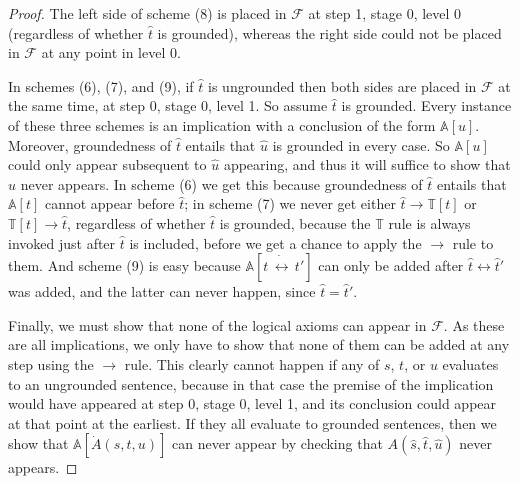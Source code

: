 \documentclass[10pt,a4paper]{amsart}
\begin{document}
\begin{proof}
  The left side of scheme (8) is placed in $\mathcal{F}$ at step 1, stage 0, level 0 (regardless of whether $\hat{t}$
  is grounded), whereas the right side could not be placed in $\mathcal{F}$ at any point in level 0.

  In schemes (6), (7), and (9), if $\hat{t}$ is ungrounded then both sides are placed in $\mathcal{F}$ at the same
  time, at step 0, stage 0, level 1. So assume $\hat{t}$ is grounded. Every instance of these three schemes is an
  implication with a conclusion of the form $\mathbb{A}[u]$.
  Moreover, groundedness of $\hat{t}$ entails that $\hat{u}$ is grounded in
  every case. So $\mathbb{A}[u]$ could only appear subsequent to $\hat{u}$ appearing, and thus it will suffice
  to show that $\hat{u}$ never appears. In scheme (6) we get this because groundedness of $\hat{t}$ entails that
  $\mathbb{A}[t]$ cannot appear before $\hat{t}$; in scheme (7) we never get either $\hat{t} \to \mathbb{T}[t]$
  or $\mathbb{T}[t] \to \hat{t}$, regardless of whether $\hat{t}$ is grounded, because the $\mathbb{T}$ rule is
  always invoked just after $\hat{t}$ is included, before we get a chance to apply the
  $\to$ rule to them. And scheme (9) is easy because $\mathbb{A}[t\, \dot{\leftrightarrow}\, t']$ can only be
  added after $\hat{t} \leftrightarrow \hat{t}'$ was added, and the latter can never happen, since $\hat{t} =
  \hat{t}'$.

  Finally, we must show that none of the logical axioms can appear in $\mathcal{F}$. As these are all implications,
  we only have to show that none of them can be added at any step using the $\to$ rule. This clearly cannot happen
  if any of $s$, $t$, or $u$ evaluates to an ungrounded sentence, because in that case the premise of the implication
  would have appeared at step 0, stage 0, level 1, and its conclusion could appear at that point at the earliest. If
  they all evaluate to grounded sentences, then we show that $\mathbb{A}[\dot{A}(s,t,u)]$ can never appear by checking
  that $A(\hat{s}, \hat{t}, \hat{u})$ never appears.


\end{proof}
\end{document}
